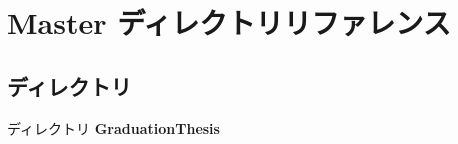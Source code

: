 \section{Master ディレクトリリファレンス}
\label{dir_f222f4b39d8b1349931d836df5dbea5a}
\subsection*{ディレクトリ}
\begin{DoxyCompactItemize}
\item 
ディレクトリ {\bf Graduation\-Thesis}
\end{DoxyCompactItemize}
